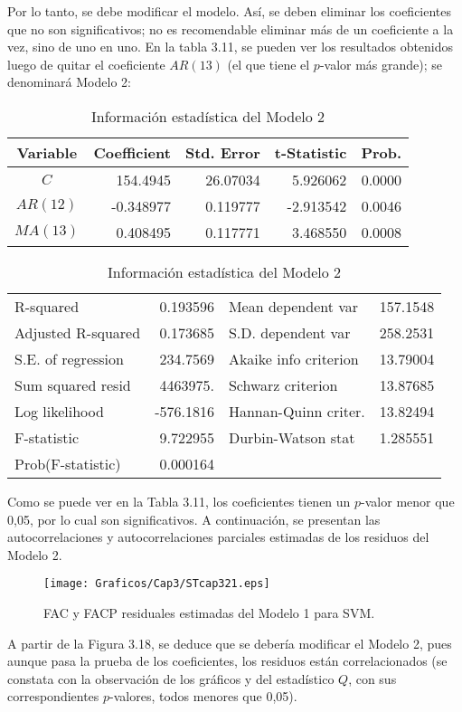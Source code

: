 Por lo tanto, se debe modificar el modelo. As\'{i}, se deben eliminar los coeficientes que no son significativos; no es recomendable eliminar m\'{a}s de un coeficiente a la vez, sino de uno en uno. En la tabla 3.11, se pueden ver los resultados obtenidos luego de quitar el coeficiente $AR(13)$ (el que tiene el $p$-valor m\'{a}s grande); se denominar\'{a} Modelo 2:

\begin{table}[H]
\centering\small
\caption{Informaci\'{o}n estad\'{i}stica del Modelo 2}
\begin{tabular}{@{}crrrr@{}}
\toprule
Variable& Coefficient& Std. Error& t-Statistic& Prob. \\
\midrule
$C$& 154.4945& 26.07034& 5.926062& 0.0000 \\
$AR(12)$& -0.348977& 0.119777& -2.913542& 0.0046 \\
$MA(13)$& 0.408495& 0.117771& 3.468550& 0.0008 \\
\bottomrule
\end{tabular}

\begin{tabular}{@{}lrlr@{}}
\toprule
R-squared& 0.193596& Mean dependent var & 157.1548 \\
Adjusted R-squared& 0.173685& S.D. dependent var & 258.2531 \\
S.E. of regression& 234.7569& Akaike info criterion & 13.79004 \\
Sum squared resid& 4463975.& Schwarz criterion & 13.87685 \\
Log likelihood& -576.1816& Hannan-Quinn criter. & 13.82494 \\
F-statistic& 9.722955& Durbin-Watson stat & 1.285551 \\
Prob(F-statistic)& 0.000164&  \\
\bottomrule
\end{tabular}
\end{table}

Como se puede ver en la Tabla 3.11, los coeficientes tienen un $p$-valor menor que 0,05, por lo cual son significativos. A continuaci\'{o}n, se presentan las autocorrelaciones y autocorrelaciones parciales estimadas de los residuos del Modelo 2.

\begin{figure}[H]
\centering
\texttt{[image: Graficos/Cap3/STcap321.eps]}
\caption{FAC y FACP residuales estimadas del Modelo 1 para SVM.}
\end{figure}

A partir de la Figura 3.18, se deduce que se deber\'{i}a modificar el Modelo 2, pues aunque pasa la prueba de los coeficientes, los residuos est\'{a}n correlacionados (se constata con la observaci\'{o}n de los gr\'{a}ficos y del estad\'{i}stico $Q$, con sus correspondientes $p$-valores, todos menores que 0,05).


